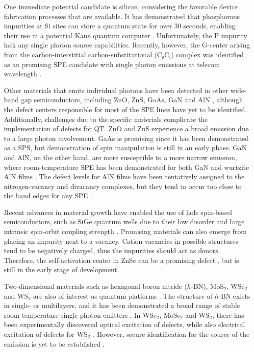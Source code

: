 One immediate potential candidate is silicon, considering the favorable device fabrication processes that are available. It has demonstrated that phosphorous impurities at Si sites can store a quantum state for over $30$ seconds, enabling their use in a potential Kane quantum computer \cite{Zhang2020}. Unfortunately, the P impurity lack any single photon source capabilities. Recently, however, the G-center arising from the carbon-interstitial carbon-substitutional ($\text{C}_{\text{s}}\text{C}_{\text{i}}$) complex was identified as an promising SPE candidate with single photon emissions at telecom wavelength \cite{Redjem2020}.

Other materials that emits individual photons have been detected in other wide-band gap semiconductors, including ZnO, ZnS, GaAs, GaN and AlN \cite{Wang2014, Zhang2020}, although the defect centers responsible for most of the SPE lines have yet to be identified. Additionally, challenges due to the specific materials complicate the implementation of defects for QT. ZnO and ZnS experience a broad emission due to a large photon involvement. GaAs is promising since it has been demonstrated as a SPS, but demonstration of spin manipulation is still in an early phase\cite{Wang2014}. GaN and AlN, on the other hand, are more susceptible to a more narrow emission, where room-temperature SPE has been demonstrated for both GaN \cite{Berhane2018} and wurtzite AlN films \cite{Xue2020}. The defect levels for AlN films have been tentatively assigned to the nitrogen-vacancy and divacancy complexes, but they tend to occur too close to the band edges for any SPE \cite{Zhang2020, Varley2016}.

Recent advances in material growth have enabled the use of hole spin-based semiconductors, such as SiGe quantum wells due to their low disorder and large intrinsic spin-orbit coupling strength \cite{Hardy2019}. Promising materials can also emerge from placing an impurity next to a vacancy. Cation vacancies in possible structures tend to be negatively charged, thus the impurities should act as donors. Therefore, the self-activation center in ZnSe can be a promising defect  \cite{Weber2010}, but is still in the early stage of development.

Two-dimensional materials such as hexagonal boron nitride ($h$-BN), MoS$_2$, WSe$_2$ and WS$_2$ are also of interest as quantum platforms \cite{Toth2019, Atatuere2018}. The structure of $h$-BN exists in single- or multilayers, and it has been demonstrated a broad range of stable room-temperature single-photon emitters \cite{Tran2016, Tran2016a}. In WSe$_2$, MoSe$_2$ and WS$_2$, there has been experimentally discovered optical excitation of defects, while also electrical excitation of defects for WS$_2$ \cite{Atatuere2018}. However, secure identification for the source of the emission is yet to be established  \cite{Weston2018, Abdi2018, Atatuere2018}.


